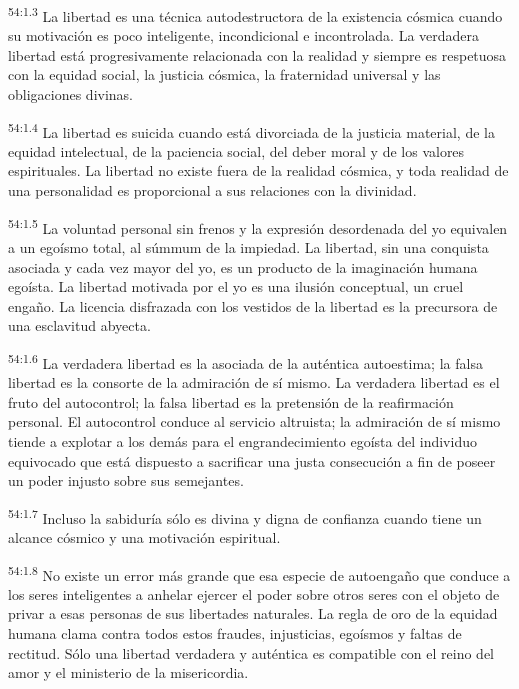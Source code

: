 \par
\textsuperscript{54:1.3} La libertad es una técnica autodestructora de la existencia cósmica cuando su motivación es poco inteligente, incondicional e incontrolada. La verdadera libertad está progresivamente relacionada con la realidad y siempre es respetuosa con la equidad social, la justicia cósmica, la fraternidad universal y las obligaciones divinas.

\par
\textsuperscript{54:1.4} La libertad es suicida cuando está divorciada de la justicia material, de la equidad intelectual, de la paciencia social, del deber moral y de los valores espirituales. La libertad no existe fuera de la realidad cósmica, y toda realidad de una personalidad es proporcional a sus relaciones con la divinidad.

\par
\textsuperscript{54:1.5} La voluntad personal sin frenos y la expresión desordenada del yo equivalen a un egoísmo total, al súmmum de la impiedad. La libertad, sin una conquista asociada y cada vez mayor del yo, es un producto de la imaginación humana egoísta. La libertad motivada por el yo es una ilusión conceptual, un cruel engaño. La licencia disfrazada con los vestidos de la libertad es la precursora de una esclavitud abyecta.

\par
\textsuperscript{54:1.6} La verdadera libertad es la asociada de la auténtica autoestima; la falsa libertad es la consorte de la admiración de sí mismo. La verdadera libertad es el fruto del autocontrol; la falsa libertad es la pretensión de la reafirmación personal. El autocontrol conduce al servicio altruista; la admiración de sí mismo tiende a explotar a los demás para el engrandecimiento egoísta del individuo equivocado que está dispuesto a sacrificar una justa consecución a fin de poseer un poder injusto sobre sus semejantes.

\par
\textsuperscript{54:1.7} Incluso la sabiduría sólo es divina y digna de confianza cuando tiene un alcance cósmico y una motivación espiritual.

\par
\textsuperscript{54:1.8} No existe un error más grande que esa especie de autoengaño que conduce a los seres inteligentes a anhelar ejercer el poder sobre otros seres con el objeto de privar a esas personas de sus libertades naturales. La regla de oro de la equidad humana clama contra todos estos fraudes, injusticias, egoísmos y faltas de rectitud. Sólo una libertad verdadera y auténtica es compatible con el reino del amor y el ministerio de la misericordia.

